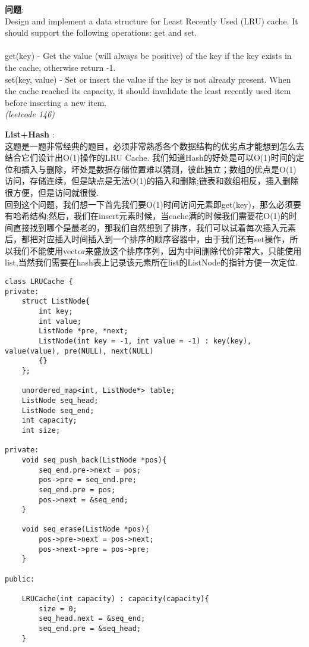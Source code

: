    
\begin{description}
    \item{\textbf{问题}}:\\
Design and implement a data structure for Least Recently Used (LRU) cache. It should support the following operations: get and set.\\
\\
get(key) - Get the value (will always be positive) of the key if the key exists in the cache, otherwise return -1.\\
set(key, value) - Set or insert the value if the key is not already present. When the cache reached its capacity, it should invalidate the least recently used item before inserting a new item.\\
\textit{(leetcode 146)}
    \item{\textbf{List+Hash}} : 
    \\这题是一题非常经典的题目，必须非常熟悉各个数据结构的优劣点才能想到怎么去结合它们设计出O(1)操作的LRU Cache. 我们知道Hash的好处是可以O(1)时间的定位和插入与删除，坏处是数据存储位置难以猜测，彼此独立；数组的优点是O(1)访问，存储连续，但是缺点是无法O(1)的插入和删除;链表和数组相反，插入删除很方便，但是访问就很慢.
	\\回到这个问题，我们想一下首先我们要O(1)时间访问元素即get(key)，那么必须要有哈希结构;然后，我们在insert元素时候，当cache满的时候我们需要花O(1)的时间直接找到哪个是最老的，那我们自然想到了排序，我们可以试着每次插入元素后，都把对应插入时间插入到一个排序的顺序容器中，由于我们还有set操作，所以我们不能使用vector来盛放这个排序序列，因为中间删除代价非常大，只能使用list,当然我们需要在hash表上记录该元素所在list的ListNode的指针方便一次定位.
    \begin{lstlisting}
class LRUCache {
private:
	struct ListNode{
		int key;
		int value;
		ListNode *pre, *next;
		ListNode(int key = -1, int value = -1) : key(key), value(value), pre(NULL), next(NULL)
		{} 
	};

	unordered_map<int, ListNode*> table;
	ListNode seq_head;
	ListNode seq_end;
	int capacity;
	int size;

private:
	void seq_push_back(ListNode *pos){
		seq_end.pre->next = pos;
		pos->pre = seq_end.pre;
		seq_end.pre = pos;
		pos->next = &seq_end;
	}

	void seq_erase(ListNode *pos){
		pos->pre->next = pos->next;
		pos->next->pre = pos->pre;
	}

public:

	LRUCache(int capacity) : capacity(capacity){
		size = 0;
		seq_head.next = &seq_end;
		seq_end.pre = &seq_head;
	}


\end{lstlisting}
\end{description}
